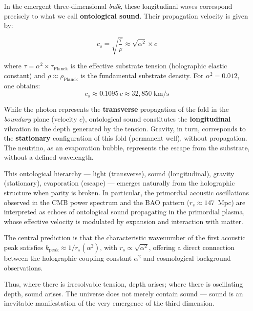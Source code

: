 \documentclass[12pt,a4paper,twoside]{article}
\newcommand{\alphaii}{\alpha^{2}}
\newcommand{\boundary}{\textit{boundary}}
\newcommand{\bulk}{\textit{bulk}}
\begin{document}
In the emergent three-dimensional \bulk, these longitudinal waves correspond precisely to what we call \textbf{ontological sound}. Their propagation velocity is given by:
\begin{equationbox}[title={Ontological Sound Velocity}]
\begin{equation}
c_s = \sqrt{\frac{\tau}{\rho}} \approx \sqrt{\alphaii}\times c
\label{eq:som_ontologico}
\end{equation}
\end{equationbox}

\noindent where $\tau = \alphaii \times \tau_{\text{Planck}}$ is the effective substrate tension (holographic elastic constant) and $\rho \approx \rho_{\text{Planck}}$ is the fundamental substrate density. For $\alphaii = 0.012$, one obtains:
\begin{equation}
c_s \approx 0.1095\,c \approx 32{,}850\;\text{km/s}
\label{eq:cs_numerico}
\end{equation}

While the photon represents the \textbf{transverse} propagation of the fold in the \boundary{} plane (velocity $c$), ontological sound constitutes the \textbf{longitudinal} vibration in the depth generated by the tension. Gravity, in turn, corresponds to the \textbf{stationary} configuration of this fold (permanent well), without propagation. The neutrino, as an evaporation bubble, represents the escape from the substrate, without a defined wavelength.

This ontological hierarchy --- light (transverse), sound (longitudinal), gravity (stationary), evaporation (escape) --- emerges naturally from the holographic structure when parity is broken. In particular, the primordial acoustic oscillations observed in the CMB power spectrum and the BAO pattern ($r_s \approx 147$~Mpc) are interpreted as echoes of ontological sound propagating in the primordial plasma, whose effective velocity is modulated by expansion and interaction with matter.

The central prediction is that the characteristic wavenumber of the first acoustic peak satisfies $k_{\text{peak}} \approx 1/r_s(\alphaii)$, with $r_s \propto \sqrt{\alphaii}$, offering a direct connection between the holographic coupling constant $\alphaii$ and cosmological background observations.

Thus, where there is irresolvable tension, depth arises; where there is oscillating depth, sound arises. The universe does not merely contain sound --- sound is an inevitable manifestation of the very emergence of the third dimension.
\end{document}
